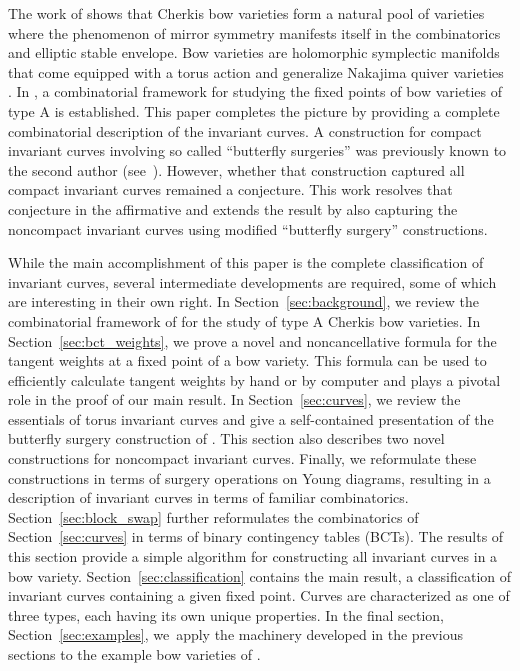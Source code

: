 \documentclass[pdftex]{sigma}
\numberwithin{equation}{section}
\begin{document}
The work of \cite{BR} shows that Cherkis bow varieties \cite{C1, C2, C3, NT} form a natural pool of varieties where the phenomenon of mirror symmetry manifests itself in the combinatorics and elliptic stable envelope. Bow varieties are holomorphic symplectic manifolds that come equipped with a torus action and generalize Nakajima quiver varieties \cite{N_quiver}. In \cite{RS}, a combinatorial framework for studying the fixed points of bow varieties of type A is established. This paper completes the picture by providing a complete combinatorial description of the invariant curves. A construction for compact invariant curves involving so called ``butterfly surgeries'' was previously known to the second author (see~\cite{S}). However, whether that construction captured all compact invariant curves remained a conjecture. This work resolves that conjecture in the affirmative and extends the result by also capturing the noncompact invariant curves using modified ``butterfly surgery'' constructions.

While the main accomplishment of this paper is the complete classification of invariant curves, several intermediate developments are required, some of which are interesting in their own right. In Section~\ref{sec:background}, we review the combinatorial framework of \cite{RS} for the study of type A Cherkis bow varieties. In Section~\ref{sec:bct_weights}, we prove a novel and noncancellative formula for the tangent weights at a fixed point of a bow variety. This formula can be used to efficiently calculate tangent weights by hand or by computer and plays a pivotal role in the proof of our main result. In Section~\ref{sec:curves}, we review the essentials of torus invariant curves and give a self-contained presentation of the butterfly surgery construction of \cite{S}. This section also describes two novel constructions for noncompact invariant curves. Finally, we reformulate these constructions in terms of surgery operations on Young diagrams, resulting in a description of invariant curves in terms of familiar combinatorics. Section~\ref{sec:block_swap} further reformulates the combinatorics of Section~\ref{sec:curves} in terms of binary contingency tables (BCTs). The results of this section provide a simple algorithm for constructing all invariant curves in a bow variety. Section~\ref{sec:classification} contains the main result, a classification of invariant curves containing a given fixed point. Curves are characterized as one of three types, each having its own unique properties. In the final section, Section~\ref{sec:examples}, we~apply the machinery developed in the previous sections to the example bow varieties of \cite{RS}.
\end{document}
